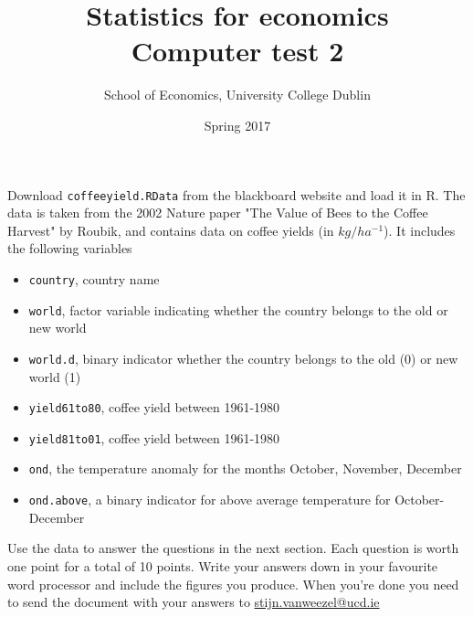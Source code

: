 \documentclass{tufte-handout}
\title{Statistics for economics \\ Computer test 2}
\author{School of Economics, University College Dublin}
\date{Spring 2017}
\begin{document}
\maketitle  

\vspace{.5cm}
Download \texttt{coffeeyield.RData} from the blackboard website and load it in R. 
The data is taken from the 2002 Nature paper "The Value of Bees to the Coffee Harvest" by Roubik, and contains data on coffee yields (in $kg/ha^{-1}$). 
It includes the following variables
\begin{itemize}
  \item \texttt{country}, country name
  \item \texttt{world}, factor variable indicating whether the country belongs to the old or new world
  \item \texttt{world.d}, binary indicator whether the country belongs to the old (0) or new world (1)
  \item \texttt{yield61to80}, coffee yield between 1961-1980
  \item \texttt{yield81to01}, coffee yield between 1961-1980
  \item \texttt{ond}, the temperature anomaly for the months October, November, December
  \item \texttt{ond.above}, a binary indicator for above average temperature for October-December
\end{itemize}

Use the data to answer the questions in the next section. 
Each question is worth one point for a total of 10 points. 
Write your answers down in your favourite word processor and include the figures you produce. 
When you're done you need to send the document with your answers to \href{stijn.vanweezel@ucd.ie}{stijn.vanweezel@ucd.ie}

\clearpage
\end{document}
